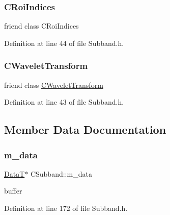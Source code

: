 \subsubsection{\texorpdfstring{CRoiIndices}{CRoiIndices}}
{\footnotesize\ttfamily friend class C\+Roi\+Indices\hspace{0.3cm}{\ttfamily [friend]}}



Definition at line 44 of file Subband.\+h.

\mbox{\label{classCSubband_a30d2cc4fc1b1060bf29a6576d926a615}} 
\subsubsection{\texorpdfstring{CWaveletTransform}{CWaveletTransform}}
{\footnotesize\ttfamily friend class \mbox{\hyperlink{classCWaveletTransform}{C\+Wavelet\+Transform}}\hspace{0.3cm}{\ttfamily [friend]}}



Definition at line 43 of file Subband.\+h.



\subsection{Member Data Documentation}
\mbox{\label{classCSubband_a8181f6adf76abb704ae8990843fdc2c4}} 
\subsubsection{\texorpdfstring{m\_data}{m\_data}}
{\footnotesize\ttfamily \mbox{\hyperlink{PGFtypes_8h_acb1ee3f52ccfad782dcaa0abd79e5d05}{DataT}}$\ast$ C\+Subband\+::m\+\_\+data\hspace{0.3cm}{\ttfamily [private]}}



buffer 



Definition at line 172 of file Subband.\+h.

\mbox{\label{classCSubband_a274d3cbc79f66725f961e3216b823167}} 
